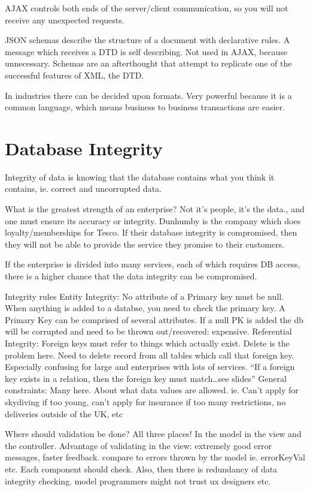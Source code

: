 \documentclass[11pt]{article}
\begin{document}
AJAX controls both ends of the server/client communication, so you will not receive any unexpected requests.

JSON schemas describe the structure of a document with declarative rules. A message which receives a DTD is self describing. Not used in AJAX, because unnecessary. Schemas are an afterthought that attempt to replicate one of the successful features of XML, the DTD.

In industries there can be decided upon formats. Very powerful because it is a common language, which means business to business transactions are easier.




\section{Database Integrity}

Integrity of data is knowing that the database contains what you think it contains, ie. correct and uncorrupted data.

What is the greatest strength of an enterprise? Not it’s people, it’s the data., and one must ensure its accuracy or integrity. Dunhumby is the company which does loyalty/memberships for Tesco. If their database integrity is compromised, then they will not be able to provide the service they promise to their customers.

If the enterprise is divided into many services, each of which requires DB access, there is a higher chance that the data integrity can be compromised.

Integrity rules
Entity Integrity: No attribute of a Primary key must be null. When anything is added to a databse, you need to check the primary key. A Primary Key can be comprised of several attributes. If a null PK is added the db will be corrupted and need to be thrown out/recovered: expensive.
Referential Integrity: Foreign keys must refer to things which actually exist. Delete is the problem here. Need to delete record from all tables which call that foreign key. Especially confusing for large and enterprises with lots of services. “If a foreign key exists in a relation, then the foreign key must match…see slides”
General constraints: Many here. About what data values are allowed. ie. Can’t apply for skydiving if too young, can’t apply for insurance if too many restrictions, no deliveries outside of the UK, etc

Where should validation be done?
All three places! In the model in the view and the controller. Advantage of validating in the view: extremely good error messages, faster feedback. compare to errors thrown by the model ie. errorKeyVal etc. Each component should check. Also, then there is redundancy of data integrity checking. model programmers might not trust ux designers etc.
\end{document}
